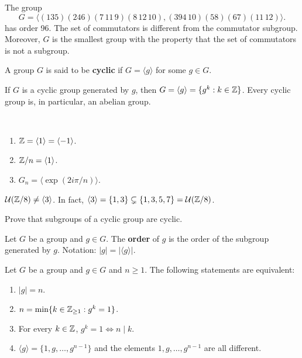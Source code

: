 \begin{example}
The group 
\[
G=\langle (135)(246)(7\,11\,9)(8\,12\,10),(394\,10)(58)(67)(11\,12)\rangle.
\]
has order 96. The set of commutators 
is different from the commutator subgroup. Moreover, 
$G$ is the smallest group with the property that  
the set of commutators is not a subgroup. 
\end{example}


\begin{definition}
        A group $G$ is said to be \textbf{cyclic} if 
        $G=\langle g\rangle$ for some 
        $g\in G$.
\end{definition}

If $G$ is a cyclic group generated by $g$, then 
$G=\langle g\rangle=\{g^k:k\in\mathbb{Z}\}$. Every cyclic group is, 
in particular, an abelian group. 

\begin{examples}\
\begin{enumerate}
        \item $\mathbb{Z}=\langle 1\rangle=\langle -1\rangle$.
        \item $\mathbb{Z}/n=\langle 1\rangle$.
        \item $G_n=\langle \exp(2i\pi/n)\rangle$.
\end{enumerate}
\end{examples}

\begin{example}
        $\mathcal{U}(\mathbb{Z}/8)\ne\langle 3\rangle$. In fact, $\langle 3\rangle=\{1,3\}\subsetneq\{1,3,5,7\}=\mathcal{U}(\mathbb{Z}/8)$.
\end{example}

\begin{exercise}
\label{xca:subgroups_cyclic}
        Prove that subgroups of a cyclic group are cyclic.
\end{exercise}

\begin{definition}
        Let $G$ be a group and $g\in G$. The \textbf{order} of $g$
        is the order of the subgroup generated by $g$. Notation:
        $|g|=|\langle g\rangle|$.
\end{definition}


\begin{theorem}
        Let $G$ be a group and $g\in G$ and $n\geq1$. 
        The following statements are equivalent:
        \begin{enumerate}
                \item $|g|=n$.
                \item $n=\min\{k\in\mathbb{Z}_{\geq1}:g^k=1\}$.
                \item For every $k\in\mathbb{Z}$, $g^k=1\Longleftrightarrow n\mid k$.
                \item $\langle g\rangle=\{1,g,\dots,g^{n-1}\}$ and 
                the elements $1,g,\dots,g^{n-1}$ are all different.
        \end{enumerate}
\end{theorem}


